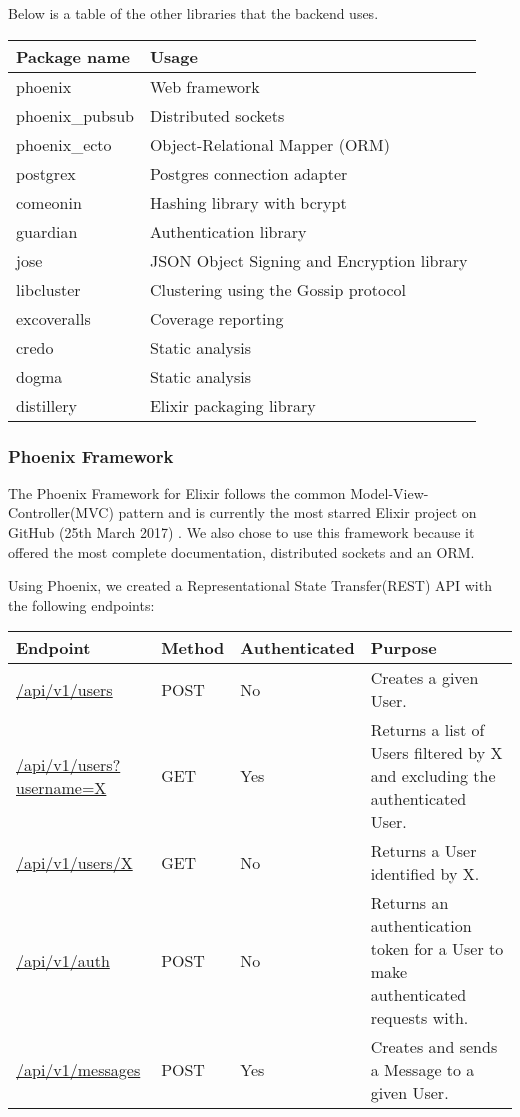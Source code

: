\documentclass[11pt,a4paper]{report}
\begin{document}
Below is a table of the other libraries that the backend uses.

\begin{tabular}{| l | l |}
  \hline
  Package name & Usage \\
  \hline
  phoenix & Web framework \\
  phoenix\_pubsub & Distributed sockets \\
  phoenix\_ecto & Object-Relational Mapper (ORM) \\
  \hline
  postgrex & Postgres connection adapter \\
  comeonin & Hashing library with bcrypt \\
  guardian & Authentication library \\
  jose & JSON Object Signing and Encryption library \\
  libcluster & Clustering using the Gossip protocol \\
  \hline
  excoveralls & Coverage reporting \\
  credo & Static analysis \\
  dogma & Static analysis \\
  distillery & Elixir packaging library \\
  \hline
\end{tabular}

\subsubsection{Phoenix Framework}

The Phoenix Framework for Elixir follows the common Model-View-Controller(MVC) pattern and is currently the most starred Elixir project on GitHub (25th March 2017) \cite{website:github_elixir_trending}. We also chose to use this framework because it offered the most complete documentation, distributed sockets and an ORM.

Using Phoenix, we created a Representational State Transfer(REST) API with the following endpoints:

\begin{center}
\begin{tabular}{| l | l | l | p{4cm} |}
  \hline
  Endpoint & Method & Authenticated & Purpose \\
  \hline
  \url{/api/v1/users} & POST & No & Creates a given User. \\
  \hline
  \url{/api/v1/users?username=X} & GET & Yes & Returns a list of Users filtered by X and excluding the authenticated User. \\
  \hline
  \url{/api/v1/users/X} & GET & No & Returns a User identified by X. \\
  \hline
  \url{/api/v1/auth} & POST & No & Returns an authentication token for a User to make authenticated requests with. \\
  \hline
  \url{/api/v1/messages} & POST & Yes & Creates and sends a Message to a given User. \\
  \hline
\end{tabular}
\end{center}
\end{document}

